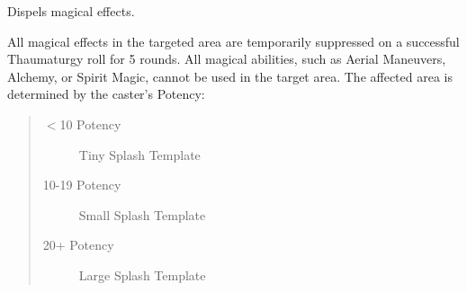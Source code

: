 \documentclass[11pt,a4paper,twocolumn]{book}
\begin{document}
\medskip

Dispels magical effects.

All magical effects in the targeted area are temporarily suppressed on a successful Thaumaturgy roll for 5 rounds. All magical abilities, such as Aerial Maneuvers, Alchemy, or Spirit Magic, cannot be used in the target area. The affected area is determined by the caster's Potency:

\begin{quote}
	\begin{description}
		\item[$<$10 Potency] 	Tiny Splash Template
		\item[10-19 Potency] 	Small Splash Template
		\item[20+ Potency] 	Large Splash Template
	\end{description}
\end{quote}

%	

%
\end{document}
